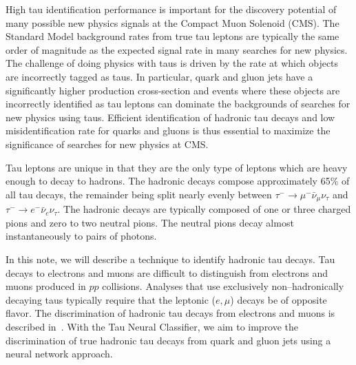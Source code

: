 High tau identification performance is important for the discovery potential of
many possible new physics signals at the Compact Muon Solenoid (CMS).  The
Standard Model background rates from true tau leptons are typically the same
order of magnitude as the expected signal rate in many searches for new
physics.  The challenge of doing physics with taus is driven by the rate at
which objects are incorrectly tagged as taus.  In particular, quark and gluon
jets have a significantly higher production cross-section and events where
these objects are incorrectly identified as tau leptons can dominate the
backgrounds of searches for new physics using taus.  Efficient identification
of hadronic tau decays and low misidentification rate for quarks and gluons
is thus essential to maximize the significance of searches for new physics at
CMS.



Tau leptons are unique in that they are the only type of leptons which are heavy
enough to decay to hadrons.  The hadronic decays compose approximately 65\% of
all tau decays, the remainder being split nearly evenly between $\tau^{-}
\rightarrow \mu^{-} \bar \nu_\mu \nu_\tau$ and $\tau^{-} \rightarrow e^{-} \bar
\nu_e \nu_\tau$.  The hadronic decays are typically composed of one or three charged
pions and zero to two neutral pions.  The neutral pions decay almost
instantaneously to pairs of photons.

In this note, we will describe a technique to identify hadronic tau decays.  Tau
decays to electrons and muons are difficult to distinguish from electrons and
muons produced in $pp$ collisions.  Analyses that use exclusively
non--hadronically decaying taus typically require that the leptonic ($e,\mu$)
decays be of opposite flavor.  The discrimination of hadronic tau decays from
electrons and muons is described in~\cite{PFT08001}.  With the Tau Neural
Classifier, we aim to improve the discrimination of true hadronic tau decays
from quark and gluon jets using a neural network approach.

